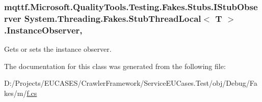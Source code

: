 \hypertarget{class_system_1_1_threading_1_1_fakes_1_1_stub_thread_local_3_01_t_01_4_a3f3c39f0cbfa8381c001e2d8ee5498cc}{
\subsubsection[{Instance\-Observer}]{\setlength{\rightskip}{0pt plus 5cm}mqttf.\-Microsoft.\-Quality\-Tools.\-Testing.\-Fakes.\-Stubs.\-I\-Stub\-Observer System.\-Threading.\-Fakes.\-Stub\-Thread\-Local$<$ T $>$.Instance\-Observer\hspace{0.3cm}{\ttfamily [get]}, {\ttfamily [set]}}}\label{class_system_1_1_threading_1_1_fakes_1_1_stub_thread_local_3_01_t_01_4_a3f3c39f0cbfa8381c001e2d8ee5498cc}


Gets or sets the instance observer.



The documentation for this class was generated from the following file\-:\begin{DoxyCompactItemize}
\item 
D\-:/\-Projects/\-E\-U\-C\-A\-S\-E\-S/\-Crawler\-Framework/\-Service\-E\-U\-Cases.\-Test/obj/\-Debug/\-Fakes/m/\hyperlink{m_2f_8cs}{f.\-cs}\end{DoxyCompactItemize}
